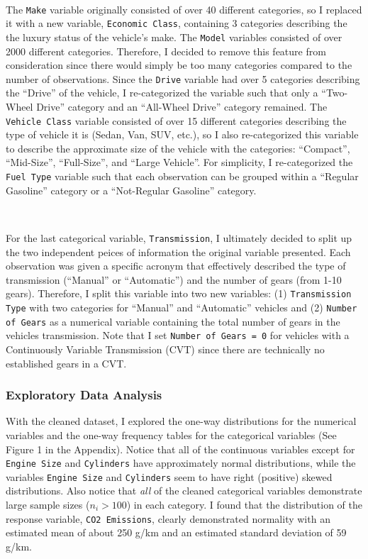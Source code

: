 \documentclass[11pt]{article}
\begin{document}
\

The \texttt{Make} variable originally consisted of over 40 different categories, so I replaced it with a new variable, \texttt{Economic Class}, containing 3 categories describing the the luxury status of the vehicle's make. The \texttt{Model} variables consisted of over 2000 different categories. Therefore, I decided to remove this feature from consideration since there would simply be too many categories compared to the number of observations. Since the \texttt{Drive} variable had over 5 categories describing the ``Drive'' of the vehicle, I re-categorized the variable such that only a ``Two-Wheel Drive'' category and an ``All-Wheel Drive'' category remained. The \texttt{Vehicle Class} variable consisted of over 15 different categories describing the type of vehicle it is (Sedan, Van, SUV, etc.), so I also re-categorized this variable to describe the approximate size of the vehicle with the categories: ``Compact'', ``Mid-Size'', ``Full-Size'', and ``Large Vehicle''. For simplicity, I re-categorized the \texttt{Fuel Type} variable such that each observation can be grouped within a ``Regular Gasoline'' category or a ``Not-Regular Gasoline'' category. 

\

For the last categorical variable, \texttt{Transmission}, I ultimately decided to split up the two independent peices of information the original variable presented. Each observation was given a specific acronym that effectively described the type of transmission (``Manual'' or ``Automatic'') and the number of gears (from 1-10 gears). Therefore, I split this variable into two new variables: (1) \texttt{Transmission Type} with two categories for ``Manual'' and ``Automatic'' vehicles and (2) \texttt{Number of Gears} as a numerical variable containing the total number of gears in the vehicles transmission. Note that I set \texttt{Number of Gears = 0} for vehicles with a Continuously Variable Transmission (CVT) since there are technically no established gears in a CVT.

\subsubsection*{Exploratory Data Analysis}

With the cleaned dataset, I explored the one-way distributions for the numerical variables and the one-way frequency tables for the categorical variables (See Figure 1 in the Appendix). Notice that all of the continuous variables except for \texttt{Engine Size} and \texttt{Cylinders} have approximately normal distributions, while the variables \texttt{Engine Size} and \texttt{Cylinders} seem to have right (positive) skewed distributions. Also notice that \textit{all} of the cleaned categorical variables demonstrate large sample sizes ($n_i > 100$) in each category. I found that the distribution of the response variable, \texttt{CO2 Emissions}, clearly demonstrated normality with an estimated mean of about 250 g/km and an estimated standard deviation of 59 g/km. 
\end{document}
